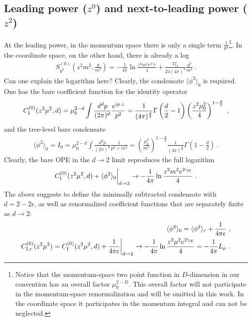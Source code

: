\documentclass[a4paper,11pt]{article}
\begin{document}
\subsection{Leading power ($z^0$) and next-to-leading power ($z^2$) }
At the leading power, in the momentum space there is only a single term $\frac{1}{p^2}$\footnote{Notice that the momentum-space two point function in $D$-dimension in our convention has an overall factor $\mu_0^{2-D}$. This overall factor will not participate in the momentum-space renormalization and will be omitted in this work. In the coordinate space it participates in the momentum integral and can not be neglected.}. In the coordinate space, on the other hand, there is already a log
\begin{align}
S_{g^2}^{(0)}\left(z^2m^2,\frac{g}{m^2}\right)=-\frac{1}{4\pi}\ln \frac{z^2m^2e^{2\gamma_E}}{4}+\frac{7\zeta_3}{24(4\pi)^3}\frac{g^2}{m^4} \ .
\end{align}
Can one explain the logarithm here? Clearly, the condensate $\langle \phi^2\rangle_0$ is required. One has the bare coefficient function for the identity operator
\begin{align}
C_{\rm I}^{(0)}(z^2\mu^2,d)=\mu^{2-d}_0\int \frac{d^dp}{(2\pi)^d}\frac{e^{ip\cdot z}}{p^2}=\frac{1}{(4\pi)^{\frac{d}{2}}}\Gamma\left(\frac{d}{2}-1\right)\left(\frac{z^2\mu_0^2}{4}\right)^{1-\frac{d}{2}} \ ,
\end{align}
and the tree-level bare condensate
\begin{align}
\langle \phi^2\rangle_0=I_0=\mu_0^{2-d}\int \frac{d^dp}{(2\pi)^d}\frac{1}{p^2+m^2}=\left(\frac{\mu_0^2}{m^2}\right)^{1-\frac{d}{2}} \frac{1}{(4\pi)^{\frac{d}{2}}}  \Gamma \left(1-\frac{d}{2}\right) \ .
\end{align}
Clearly, the bare OPE in the $d\rightarrow 2$ limit reproduces the full logarithm
\begin{align}
C_{\rm I}^{(0)}(z^2\mu^2,d)+\langle \phi^2\rangle_0 \bigg|_{d\rightarrow 2} \rightarrow -\frac{1}{4\pi}\ln \frac{z^2m^2e^{2\gamma_E}}{4} \ . 
\end{align}
The above suggests to define the minimally subtracted condensate with $d=2-2\epsilon$, as well as renormalized coefficient functions that are separately finite as $d\rightarrow 2$:
\begin{align}
\langle \phi^2\rangle_0=\langle \phi^2\rangle_r+\frac{1}{4\pi \epsilon} \ , \label{eq:constants1} \\
C_{{\rm I}, r}^{(0)}(z^2\mu^2)=C_{\rm I}^{(0)}(z^2\mu^2,d)+\frac{1}{4\pi \epsilon}\bigg|_{d\rightarrow2} \rightarrow -\frac{1}{4\pi}\ln \frac{z^2\mu^2e^{2\gamma_E}}{4}=-\frac{1}{4\pi}L_\mu \ . 
\end{align}
\end{document}
